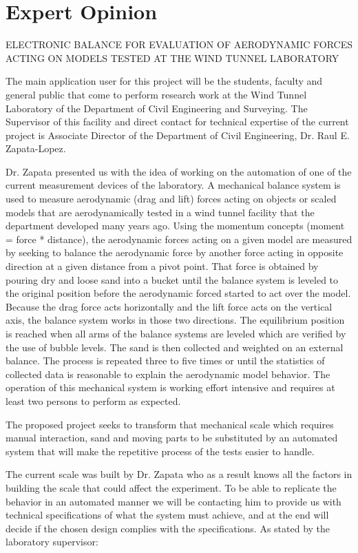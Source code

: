 \section{Expert Opinion}
	ELECTRONIC BALANCE FOR EVALUATION OF AERODYNAMIC FORCES ACTING ON MODELS TESTED AT THE WIND TUNNEL LABORATORY

	The main application user for this project will be the students, faculty and general public that come to perform research work at the Wind Tunnel Laboratory of the Department of Civil Engineering and Surveying. The Supervisor of this facility and direct contact for technical expertise of the current project is Associate Director of the Department of Civil Engineering, Dr. Raul E. Zapata-Lopez. 
	
	Dr. Zapata presented us with the idea of working on the automation of one of the current measurement 
	devices of the laboratory. A mechanical balance system is used to measure aerodynamic (drag and lift) forces acting on objects or scaled models that are aerodynamically tested in a wind tunnel facility that the department developed many years ago. Using the momentum concepts (moment = force * distance), the aerodynamic forces acting on a given model are measured by seeking to balance the aerodynamic force by another force acting in opposite direction at a given distance from a pivot point. That force is obtained by pouring dry and loose sand into a bucket until the balance system is leveled to the original position before the aerodynamic forced started to act over the model. Because the drag force acts horizontally and the lift force acts on the vertical axis, the balance system works in those two directions. The equilibrium position is reached when all arms of the balance systems are leveled which are verified by the use of bubble levels. The sand is then collected and weighted on an external balance. The process is repeated three to five times or until the statistics of collected data is reasonable to explain the aerodynamic model behavior. The operation of this mechanical system is working effort intensive and requires at least two persons to perform as expected. 

	The proposed project seeks to transform that mechanical scale which requires manual interaction, sand and moving parts to be substituted by an automated system that will make the repetitive process of the tests easier to handle. 

	The current scale was built by Dr. Zapata who as a result knows all the factors in building the scale that could affect the experiment. To be able to replicate the behavior in an automated manner we will be contacting him to provide us with technical specifications of what the system must achieve, and at the end will decide if the chosen design complies with the specifications. As stated by the laboratory supervisor:

